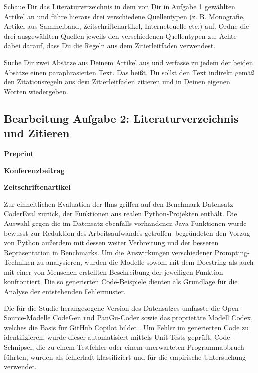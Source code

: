
\begin{enumerate}[leftmargin=*]
	\itshape{
	\item Schaue Dir das Literaturverzeichnis in dem von Dir in Aufgabe 1 gewählten Artikel an und führe hieraus drei verschiedene Quellentypen (z. B. Monografie, Artikel aus Sammelband, Zeitschriftenartikel, Internetquelle etc.) auf. Ordne die drei ausgewählten Quellen jeweils den verschiedenen Quellentypen zu. Achte dabei darauf, dass Du die Regeln aus dem Zitierleitfaden verwendest.
	\item Suche Dir zwei Absätze aus Deinem Artikel aus und verfasse zu jedem der beiden Absätze einen paraphrasierten Text. Das heißt, Du sollst den Text indirekt gemäß den Zitationsregeln aus dem Zitierleitfaden zitieren und in Deinen eigenen Worten wiedergeben.}
\end{enumerate}

\clearpage

\subsection*{Bearbeitung Aufgabe 2: Literaturverzeichnis und Zitieren}

\textbf{Preprint}

\textbf{Konferenzbeitrag}

\textbf{Zeitschriftenartikel}

Zur einheitlichen Evaluation der \glspl{llm} griffen \textcite[5-6]{tambon2025} auf den Benchmark-Datensatz CoderEval zurück, der Funktionen aus realen Python-Projekten enthält. Die Auswahl gegen die im Datensatz ebenfalls vorhandenen Java-Funktionen wurde bewusst zur Reduktion des Arbeitsaufwandes getroffen. \citeauthor{tambon2025} begründeten den Vorzug von Python außerdem mit dessen weiter Verbreitung und der besseren Repräsentation in Benchmarks. Um die Auswirkungen verschiedener Prompting-Techniken zu analysieren, wurden die Modelle sowohl mit dem Docstring als auch mit einer von Menschen erstellten Beschreibung der jeweiligen Funktion konfrontiert. Die so generierten Code-Beispiele dienten als Grundlage für die Analyse der entstehenden Fehlermuster.

Die für die Studie herangezogene Version des Datensatzes umfasste die Open-Source-Modelle CodeGen und PanGu-Coder sowie das proprietäre Modell Codex, welches die Basis für GitHub Copilot bildet \parencite[6-7]{tambon2025}. Um Fehler im generierten Code zu identifizieren, wurde dieser automatisiert mittels Unit-Tests geprüft. Code-Schnipsel, die zu einem Testfehler oder einem unerwarteten Programmabbruch führten, wurden als fehlerhaft klassifiziert und für die empirische Untersuchung verwendet.
